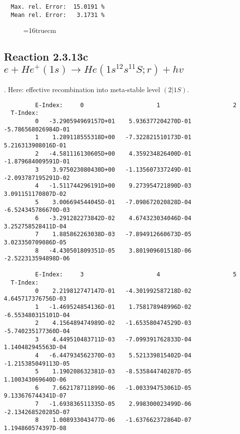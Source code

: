 \documentclass[12pt,dvipdfmx]{article}
\begin{document}
\begin{small}
\begin{verbatim}
  Max. rel. Error:  15.0191 %
  Mean rel. Error:   3.1731 %

\end{verbatim}\end{small}
\begin{figure} \label{2.3.13b}
\epsfxsize=16truecm
\end{figure}
\newpage

\subsection{
Reaction 2.3.13c $ e + He^+(1s) \rightarrow He(1s^12s^11S;r) + hv$
}

\cite{kn:Fujimoto}. Here: effective recombination into meta-stable level
$(2|1S)$.

\begin{small}\begin{verbatim}
         E-Index:     0                     1                     2
  T-Index:
         0   -3.290594969157D+01    5.936377204270D-01   -5.786568026984D-01
         1    1.289118555318D+00   -7.322821510173D-01    5.216313908016D-01
         2   -4.581116130605D+00    4.359234826400D-01   -1.879684009591D-01
         3    3.975023080430D+00   -1.135607337249D-01   -2.093787195291D-02
         4   -1.511744296191D+00    9.273954721890D-03    3.091151170807D-02
         5    3.006694544045D-01   -7.098672020828D-04   -6.524345786670D-03
         6   -3.291282273842D-02    4.674323034046D-04    3.252758528411D-04
         7    1.885862263038D-03   -7.894912660673D-05    3.023350709086D-05
         8   -4.430501809351D-05    3.801909601518D-06   -2.522313594898D-06

         E-Index:     3                     4                     5
  T-Index:
         0    2.219812747147D-01   -4.301992587218D-02    4.645717376756D-03
         1   -1.469524854136D-01    1.758178948996D-02   -6.553480315101D-04
         2    4.156489474989D-02   -1.653580474529D-03   -5.740235177360D-04
         3    4.449510483711D-03   -7.099391762833D-04    1.140482945563D-04
         4   -6.447934562370D-03    5.521339815402D-04   -1.215385049113D-05
         5    1.190208632381D-03   -8.535844740287D-05    1.100343069640D-06
         6    7.662178711899D-06   -1.003394753061D-05    9.133676744341D-07
         7   -1.693836511335D-05    2.998300023499D-06   -2.134268520285D-07
         8    1.008933043477D-06   -1.637662372864D-07    1.194860574397D-08


\end{verbatim}
\end{small}
\end{document}

